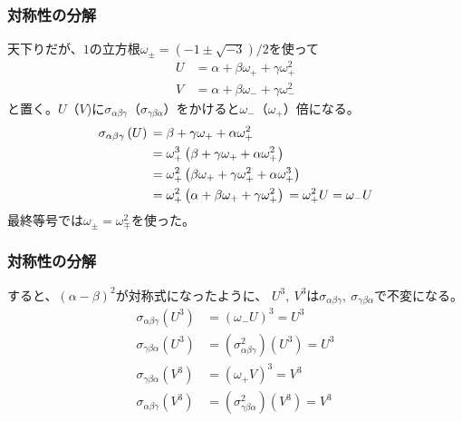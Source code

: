 \documentclass[12pt, t]{beamer}
\newcommand{\lr}[1]{\left({}#1\right){}}
\begin{document}
\begin{frame}
\frametitle{対称性の分解}
天下りだが、$1$の立方根$\omega_{\pm} = (-1 \pm \sqrt{-3})/2$を使って
\begin{align}
  U &= \alpha + \beta \omega_+ + \gamma \omega_+^2 \\
  V &= \alpha + \beta \omega_- + \gamma \omega_-^2
\end{align}
と置く。$U$（$V$)に$\sigma_{\alpha \beta \gamma}$（$\sigma_{\gamma \beta \alpha}$）をかけると$\omega_-$（$\omega_+$）倍になる。
\begin{align}
  \sigma_{\alpha \beta \gamma}\lr{U} &= \beta + \gamma \omega_+ + \alpha \omega_+^2 \notag \\
                                     &= \omega_+^3 \lr{\beta + \gamma \omega_+ + \alpha \omega_+^2} \notag \\
                                     &= \omega_+^2 \lr{\beta \omega_+ + \gamma \omega_+^2 + \alpha \omega_+^3} \notag \\
                                     &= \omega_+^2 \lr{\alpha + \beta \omega_+ + \gamma \omega_+^2} = \omega_+^2 U = \omega_- U
\end{align}
最終等号では$\omega_\pm = \omega_{\mp}^2$を使った。
\end{frame}

\begin{frame}
\frametitle{対称性の分解}
すると、$(\alpha - \beta)^2$が対称式になったように、
$U^3,\ V^3$は$\sigma_{\alpha \beta \gamma},\ \sigma_{\gamma \beta \alpha}$で不変になる。
\begin{align}
  \sigma_{\alpha \beta \gamma} \lr{U^3} &= (\omega_- U)^3 = U^3 \\
  \sigma_{\gamma \beta \alpha} \lr{U^3} &= \lr{\sigma_{\alpha \beta \gamma}^2}\lr{U^3} = U^3 \\
  \sigma_{\gamma \beta \alpha} \lr{V^3} &= (\omega_+ V)^3 = V^3 \\
  \sigma_{\alpha \beta \gamma} \lr{V^3} &= \lr{\sigma_{\gamma \beta \alpha}^2}\lr{V^3} = V^3 \\
\end{align}
\end{frame}
\end{document}
